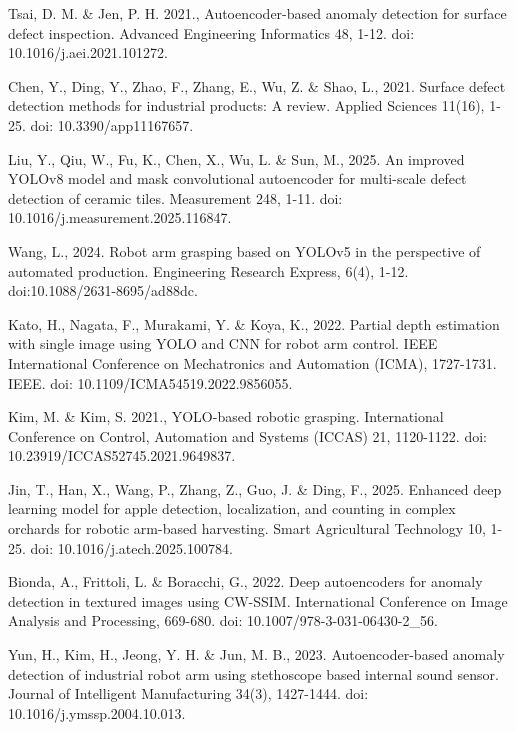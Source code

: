 \begin{thebibliography}{9}
  Tsai, D. M. \& Jen, P. H. 2021., Autoencoder-based anomaly detection
  for surface defect inspection. Advanced Engineering Informatics 48,
  1-12. doi: 10.1016/j.aei.2021.101272.

  Chen, Y., Ding, Y., Zhao, F., Zhang, E., Wu, Z. \& Shao, L., 2021.
  Surface defect detection methods for industrial products: A review.
  Applied Sciences 11(16), 1-25. doi: 10.3390/app11167657.

  Liu, Y., Qiu, W., Fu, K., Chen, X., Wu, L. \& Sun, M., 2025. An
  improved YOLOv8 model and mask convolutional autoencoder for
  multi-scale defect detection of ceramic tiles. Measurement 248,
  1-11. doi: 10.1016/j.measurement.2025.116847.

  Wang, L., 2024. Robot arm grasping based on YOLOv5 in the
  perspective of automated production. Engineering Research Express,
  6(4), 1-12. doi:10.1088/2631-8695/ad88dc.

  Kato, H., Nagata, F., Murakami, Y. \& Koya, K., 2022. Partial depth
  estimation with single image using YOLO and CNN for robot arm
  control. IEEE International Conference on Mechatronics and
  Automation (ICMA), 1727-1731. IEEE. doi: 10.1109/ICMA54519.2022.9856055.

  Kim, M. \& Kim, S. 2021., YOLO-based robotic grasping. International
  Conference on Control, Automation and
  Systems (ICCAS) 21, 1120-1122. doi: 10.23919/ICCAS52745.2021.9649837.

  Jin, T., Han, X., Wang, P., Zhang, Z., Guo, J. \& Ding, F., 2025.
  Enhanced deep learning model for apple detection, localization, and
  counting in complex orchards for robotic arm-based harvesting.
  Smart Agricultural Technology 10, 1-25. doi: 10.1016/j.atech.2025.100784.

  Bionda, A., Frittoli, L. \& Boracchi, G., 2022. Deep
  autoencoders for anomaly detection in textured images using
  CW-SSIM. International Conference on Image Analysis and
  Processing, 669-680. doi: 10.1007/978-3-031-06430-2\_56.

  Yun, H., Kim, H., Jeong, Y. H. \& Jun, M. B., 2023.
  Autoencoder-based anomaly detection of industrial robot arm using
  stethoscope based internal sound sensor. Journal of Intelligent
  Manufacturing 34(3), 1427-1444. doi: 10.1016/j.ymssp.2004.10.013.


\end{thebibliography}
